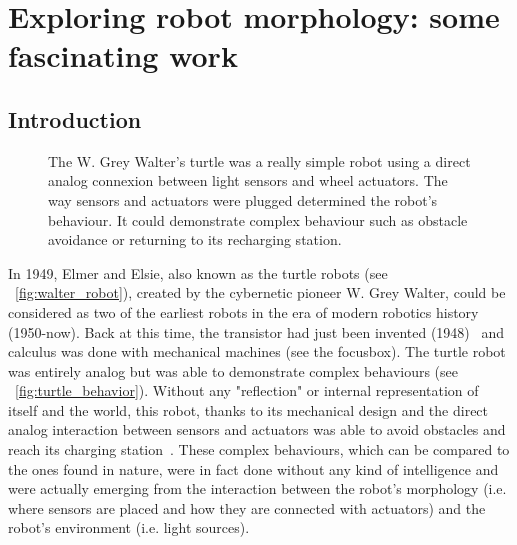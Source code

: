 
\cleartoleftpage


\chapter{Exploring robot morphology: some fascinating work} %
\label{cha:morphology-review}


\section{Introduction} %

\begin{figure}[!b]
\centering
    \hfil
    \caption{The W. Grey Walter's turtle was a really simple robot using a direct analog connexion between light sensors and wheel actuators. The way sensors and actuators were plugged determined the robot’s behaviour. It could demonstrate complex behaviour such as obstacle avoidance or returning to its recharging station.}
    \label{fig:turtle_robot}
\end{figure}


In 1949, Elmer and Elsie, also known as the turtle robots (see \figurename~\ref{fig:walter_robot}), created by the cybernetic pioneer W. Grey Walter, could be considered as two of the earliest robots in the era of modern robotics history (1950-now). Back at this time, the transistor had just been invented (1948)~\cite{brinkman1997history} and calculus was done with mechanical machines (see the focusbox). The turtle robot was entirely analog but was able to demonstrate complex behaviours (see \figurename~\ref{fig:turtle_behavior}). Without any "reflection" or internal representation of itself and the world, this robot, thanks to its mechanical design and the direct analog interaction between sensors and actuators was able to avoid obstacles and reach its charging station~\cite{walter1950imitation}.
These complex behaviours, which can be compared to the ones found in nature, were in fact done without any kind of intelligence and were actually emerging from the interaction between the robot’s morphology (i.e. where sensors are placed and how they are connected with actuators) and the robot’s environment (i.e. light sources).


